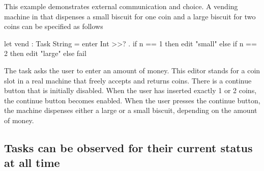 \begin{example}


This example demonstrates external communication and choice.
A vending machine in \TOPHAT that dispenses a small biscuit for one coin and a large biscuit for two coins can be specified as follows
\begin{TASK}
  let vend : Task String = enter Int >>? \n. if n == 1 then edit "small" else if n == 2 then edit "large" else fail
\end{TASK}
The task asks the user to enter an amount of money.
This editor stands for a coin slot in a real machine that freely accepts and returns coins.
There is a continue button that is initially disabled.
When the user has inserted exactly 1 or 2 coins, the continue button becomes enabled.
When the user presses the continue button, the machine dispenses either a large or a small biscuit, depending on the amount of money.

\end{example}



\subsection{Tasks can be observed for their current status at all time}

